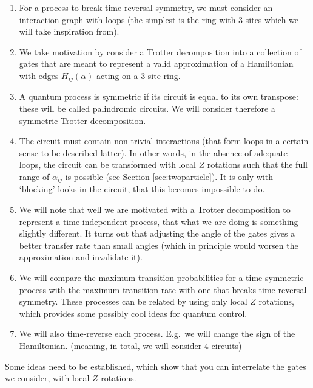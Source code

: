 \documentclass[aps,pra,12pt,nofootinbib,superscriptaddress,longbibliography,showpacs]{revtex4-1}
\theoremstyle{plain}
\theoremstyle{definition}
\begin{document}
\begin{enumerate}
 \item For a process to break time-reversal symmetry, we must consider an
interaction graph with loops (the simplest is the ring with 3 sites which we
will take inspiration from). 

\item We take motivation by consider a Trotter decomposition into a collection
of gates that are meant to represent a valid approximation of a Hamiltonian
with edges $H_{ij}(\alpha)$ acting on a 3-site ring.  

\item A quantum process is symmetric if its circuit is equal to its own
transpose: these will be called palindromic circuits.  We will consider
therefore a symmetric Trotter decomposition.  

\item The circuit must contain non-trivial interactions (that form loops in a
certain sense to be described latter).  In other words, in the absence of
adequate loops, the circuit can be transformed with local $Z$ rotations such
that the full range of $\alpha_{ij}$ is possible (see Section
\ref{sec:twoparticle}).  It is only with `blocking' looks in the circuit, that
this becomes impossible to do.  

\item We will note that well we are motivated with a Trotter decomposition to
represent a time-independent process, that what we are doing is something
slightly different.  It turns out that adjusting the angle of the gates gives a
better transfer rate than small angles (which in principle would worsen the
approximation and invalidate it).  

\item We will compare the maximum transition probabilities for a time-symmetric
process with the maximum transition rate with one that breaks time-reversal
symmetry. These processes can be related by using only local $Z$ rotations,
which provides some possibly cool ideas for quantum control.  

\item We will also time-reverse each process.  E.g.~we will change the sign of
the Hamiltonian.  (meaning, in total, we will consider 4 circuits)

\end{enumerate}

Some ideas need to be established, which show that you can interrelate the
gates we consider, with local $Z$ rotations.  
\end{document}
